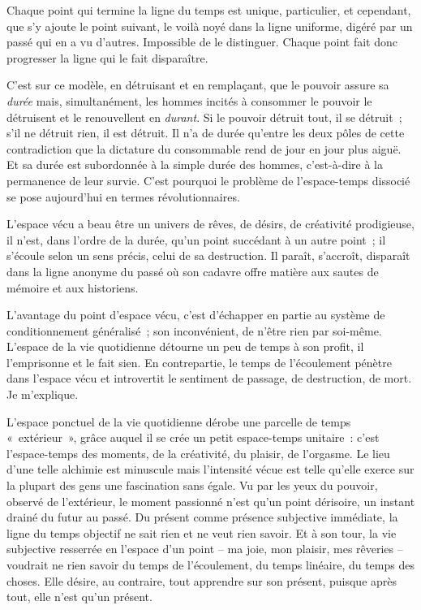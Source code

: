 \documentclass[french,twoside]{book} %
\begin{document}
Chaque point qui termine la ligne du temps est unique, particulier, et cependant, que s’y ajoute le point suivant, le voilà noyé dans la ligne uniforme, digéré par un passé qui en a vu d’autres. Impossible de le distinguer. Chaque point fait donc progresser la ligne qui le fait disparaître.\par
C’est sur ce modèle, en détruisant et en remplaçant, que le pouvoir assure sa \emph{durée} mais, simultanément, les hommes incités à consommer le pouvoir le détruisent et le renouvellent en \emph{durant}. Si le pouvoir détruit tout, il se détruit ; s’il ne détruit rien, il est détruit. Il n’a de durée qu’entre les deux pôles de cette contradiction que la dictature du consommable rend de jour en jour plus aiguë. Et sa durée est subordonnée à la simple durée des hommes, c’est-à-dire à la permanence de leur survie. C’est pourquoi le problème de l’espace-temps dissocié se pose aujourd’hui en termes révolutionnaires.\par
L’espace vécu a beau être un univers de rêves, de désirs, de créativité prodigieuse, il n’est, dans l’ordre de la durée, qu’un point succédant à un autre point ; il s’écoule selon un sens précis, celui de sa destruction. Il paraît, s’accroît, disparaît dans la ligne anonyme du passé où son cadavre offre matière aux sautes de mémoire et aux historiens.\par
L’avantage du point d’espace vécu, c’est d’échapper en partie au système de conditionnement généralisé ; son inconvénient, de n’être rien par soi-même. L’espace de la vie quotidienne détourne un peu de temps à son profit, il l’emprisonne et le fait sien. En contrepartie, le temps de l’écoulement pénètre dans l’espace vécu et introvertit le sentiment de passage, de destruction, de mort. Je m’explique.\par
L’espace ponctuel de la vie quotidienne dérobe une parcelle de temps « extérieur », grâce auquel il se crée un petit espace-temps unitaire : c’est l’espace-temps des moments, de la créativité, du plaisir, de l’orgasme. Le lieu d’une telle alchimie est minuscule mais l’intensité vécue est telle qu’elle exerce sur la plupart des gens une fascination sans égale. Vu par les yeux du pouvoir, observé de l’extérieur, le moment passionné n’est qu’un point dérisoire, un instant drainé du futur au passé. Du présent comme présence subjective immédiate, la ligne du temps objectif ne sait rien et ne veut rien savoir. Et à son tour, la vie subjective resserrée en l’espace d’un point – ma joie, mon plaisir, mes rêveries – voudrait ne rien savoir du temps de l’écoulement, du temps linéaire, du temps des choses. Elle désire, au contraire, tout apprendre sur son présent, puisque après tout, elle n’est qu’un présent.\par
\end{document}

